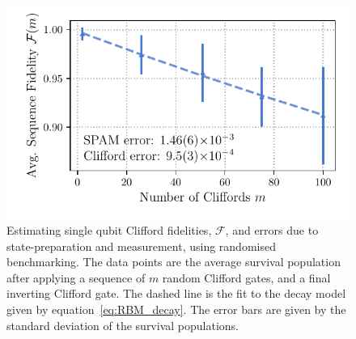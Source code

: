     \begin{figure}
        \begin{center}
        \noindent\includegraphics[width=0.75\linewidth]{
            figures/pdf_figure/rbm_fit.pdf
            }
        \end{center}
        \caption{
            Estimating single qubit Clifford fidelities, $\mathcal{F}$, and errors due to state-preparation and measurement, using randomised benchmarking. 
            The data points are the average survival population after applying a sequence of $m$ random Clifford gates, and a final inverting Clifford gate. The dashed line is the fit to the decay model given by equation~\ref{eq:RBM_decay}. The error bars are given by the standard deviation of the survival populations.
            }
        \label{fig:rbm}
    \end{figure}


